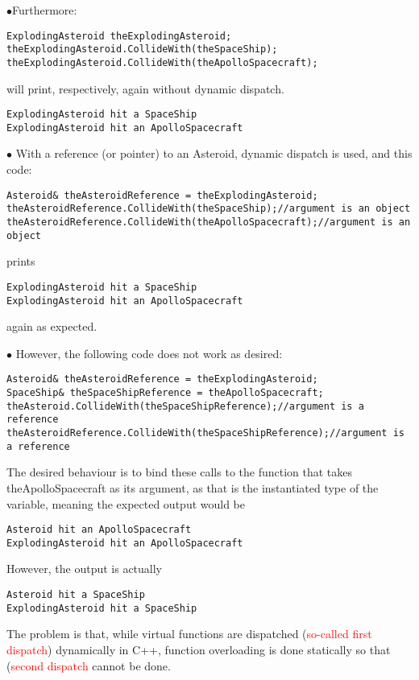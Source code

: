 \documentclass{book}
\begin{document}
$\bullet$Furthermore:
\begin{lstlisting}
ExplodingAsteroid theExplodingAsteroid;
theExplodingAsteroid.CollideWith(theSpaceShip); 
theExplodingAsteroid.CollideWith(theApolloSpacecraft);
\end{lstlisting}%
will print, respectively, again without dynamic dispatch.
{\color{gray}\begin{verbatim}
ExplodingAsteroid hit a SpaceShip 
ExplodingAsteroid hit an ApolloSpacecraft
\end{verbatim}}

$\bullet$ With a reference (or pointer) to an Asteroid, dynamic dispatch is used, and this code:

\begin{lstlisting}
Asteroid& theAsteroidReference = theExplodingAsteroid;
theAsteroidReference.CollideWith(theSpaceShip);//argument is an object 
theAsteroidReference.CollideWith(theApolloSpacecraft);//argument is an object
\end{lstlisting}%
prints 
{\color{gray}\begin{verbatim}
ExplodingAsteroid hit a SpaceShip 
ExplodingAsteroid hit an ApolloSpacecraft
\end{verbatim}}
again as expected.

$\bullet$ However, the following code does not work as desired:
\begin{lstlisting}
Asteroid& theAsteroidReference = theExplodingAsteroid;
SpaceShip& theSpaceShipReference = theApolloSpacecraft;
theAsteroid.CollideWith(theSpaceShipReference);//argument is a reference
theAsteroidReference.CollideWith(theSpaceShipReference);//argument is a reference
\end{lstlisting}%
The desired behaviour is to bind these calls to the function that takes theApolloSpacecraft as its argument, 
as that is the instantiated type of the variable, meaning the expected output would be 
{\color{green}\begin{verbatim}
Asteroid hit an ApolloSpacecraft 
ExplodingAsteroid hit an ApolloSpacecraft
\end{verbatim}}
However, the output is actually 
{\color{red}\begin{verbatim}
Asteroid hit a SpaceShip 
ExplodingAsteroid hit a SpaceShip
\end{verbatim}}
The problem is that, while virtual functions are dispatched (\textcolor{red}{so-called first dispatch}) dynamically in C++, function overloading is done statically
so that (\textcolor{red}{second dispatch} cannot be done.
\end{document}
